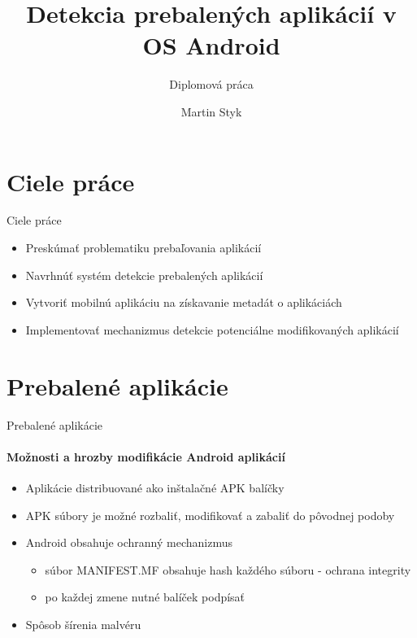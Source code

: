 \documentclass{beamer}
\title{Detekcia prebalených aplikácií v OS Android} %
\subtitle{Diplomová práca} %
\author{Martin Styk}
\begin{document}
  \frame{\maketitle}

\section{Ciele práce}
  \begin{frame}[label=lists]{Ciele práce}
    \begin{itemize}
    \item Preskúmať problematiku prebaľovania aplikácií
    \item Navrhnúť systém detekcie prebalených aplikácií
	\item Vytvoriť mobilnú aplikáciu na získavanie metadát o aplikáciách
	\item Implementovať mechanizmus detekcie potenciálne modifikovaných aplikácií
    \end{itemize}  
  \end{frame}
  
  \section{Prebalené aplikácie}
  \begin{frame}[label=lists]{Prebalené aplikácie}
 	 \framesubtitle{Možnosti a hrozby modifikácie Android aplikácií}
	\begin{itemize}
		\item Aplikácie distribuované ako inštalačné APK balíčky
	 	\item APK súbory je možné rozbaliť, modifikovať a zabaliť do pôvodnej podoby
	 	\item Android obsahuje ochranný mechanizmus
	 	 \begin{itemize}
	 	 	\item súbor MANIFEST.MF obsahuje hash každého súboru - ochrana 	integrity
	 	 	\item po každej zmene nutné balíček podpísať
		 \end{itemize}	 
		 \item Spôsob šírenia malvéru	  
	\end{itemize}
  \end{frame} 
  
\end{document}
